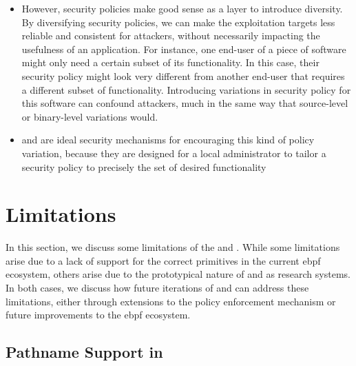 \begin{inprogress}
\begin{itemize}
    \item However, security policies make good sense as a layer to introduce diversity. By diversifying security policies, we can
    make the exploitation targets less reliable and consistent for attackers, without necessarily impacting the usefulness of an application.
    For instance, one end-user of a piece of software might only need a certain subset of its functionality. In this case, their security policy
    might look very different from another end-user that requires a different subset of functionality. Introducing variations in security policy
    for this software can confound attackers, much in the same way that source-level or binary-level variations would.
    \item \bpfbox{} and \bpfcontain{} are ideal security mechanisms for encouraging this kind of policy variation,
    because they are designed for a local administrator to tailor a security policy to precisely the set of desired functionality
  \end{itemize}
\end{inprogress}


\section{Limitations}%
\label{s:disc-limitations}

In this section, we discuss some limitations of the \bpfbox{} and \bpcontain{}.
While some limitations arise due to a lack of support for the correct primitives
in the current \gls{ebpf} ecosystem, others arise due to the prototypical nature of \bpfbox{}
and \bpfcontain{} as research systems. In both cases, we discuss how future iterations
of \bpfbox{} and \bpfcontain can address these limitations, either through extensions to
the policy enforcement mechanism or future improvements to the \gls{ebpf} ecosystem.

\subsection{Pathname Support in }

